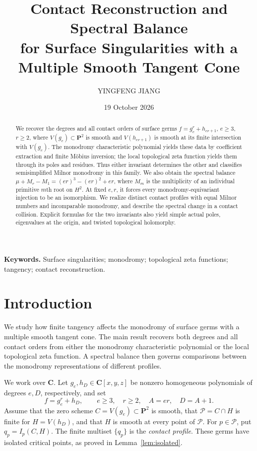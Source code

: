 \documentclass[11pt]{article}
\title{Contact Reconstruction and Spectral Balance\\
for Surface Singularities with a Multiple Smooth Tangent Cone}
\author{YINGFENG JIANG}
\date{19 October 2026}
\numberwithin{equation}{section}
\theoremstyle{definition}
\theoremstyle{remark}
\newcommand{\CC}{\mathbf C}
\newcommand{\PP}{\mathbf P}
\begin{document}
\maketitle

\begin{abstract}
We recover the degrees and all contact orders of surface germs
$f=g_e^r+h_{er+1}$, $e\ge3$, $r\ge2$, where $V(g_e)\subset\PP^2$
is smooth and $V(h_{er+1})$ is smooth at its finite intersection
with $V(g_e)$. The monodromy characteristic polynomial yields
these data by coefficient extraction and finite M\"obius inversion;
the local topological zeta function yields them through its
poles and residues. Thus either invariant determines the other
and classifies semisimplified Milnor monodromy in this family.
We also obtain the spectral balance
$\mu+M_r-M_1=(er)^3-(er)^2+er$, where $M_m$ is the multiplicity
of an individual primitive $m$th root on $H^2$. At fixed $e,r$,
it forces every monodromy-equivariant injection to be an
isomorphism. We realize distinct contact profiles with equal
Milnor numbers and incomparable monodromy, and describe the
spectral change in a contact collision. Explicit formulas for
the two invariants also yield simple actual poles, eigenvalues
at the origin, and twisted topological holomorphy.
\end{abstract}

\medskip
\noindent\textbf{Keywords.}
Surface singularities; monodromy; topological zeta functions;
tangency; contact reconstruction.

\section{Introduction}\label{sec:introduction}

We study how finite tangency affects the monodromy of surface
germs with a multiple smooth tangent cone. The main result
recovers both degrees and all contact orders from either the
monodromy characteristic polynomial or the local topological
zeta function. A spectral balance then governs comparisons
between the monodromy representations of different profiles.

We work over $\CC$. Let $g_e,h_D\in\CC[x,y,z]$ be nonzero homogeneous
polynomials of degrees $e,D$, respectively, and set
\begin{equation}\label{eq:family}
 f=g_e^r+h_D,\qquad e\ge3,\quad r\ge2,\quad A=er,\quad D=A+1.
\end{equation}
Assume that the zero scheme $C=V(g_e)\subset\PP^2$ is smooth,
that $\mathcal P=C\cap H$ is finite for $H=V(h_D)$, and that
$H$ is smooth at every point of $\mathcal P$.
For $p\in\mathcal P$, put
$q_p=I_p(C,H)$. The finite multiset $\{q_p\}$ is the
\emph{contact profile}. These germs have isolated critical points,
as proved in Lemma~\ref{lem:isolated}.
\end{document}
